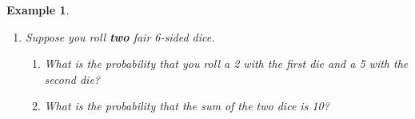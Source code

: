 \documentclass[12pt]{amsart}
\newtheorem{example}[theorem]{Example}
\begin{document}
{\begin{example}
\begin{enumerate}
\begin{enumerate}
\item What is the probability that you roll a 4?

\vspace{1.5cm}

\item What is the probability that you roll an even number?


\vspace{1.5cm}


\item What is the probability that you roll an even number and a 2?


\vspace{1.5cm}


\item What is the probability that you roll a 2 and a 5?


\vspace{1.5cm}


\item What is the probability that you did not roll a 3?


\vspace{1.5cm}


\end{enumerate}

\item Suppose you roll \textbf{two} fair 6-sided dice. 

\begin{enumerate} 
\item What is the probability that you roll a 2 with the first die and a 5 with the second die?

\vspace{1cm}

\item What is the probability that the sum of the two dice is 10?



\end{enumerate}
\end{enumerate}
\end{example}}
\end{document}
